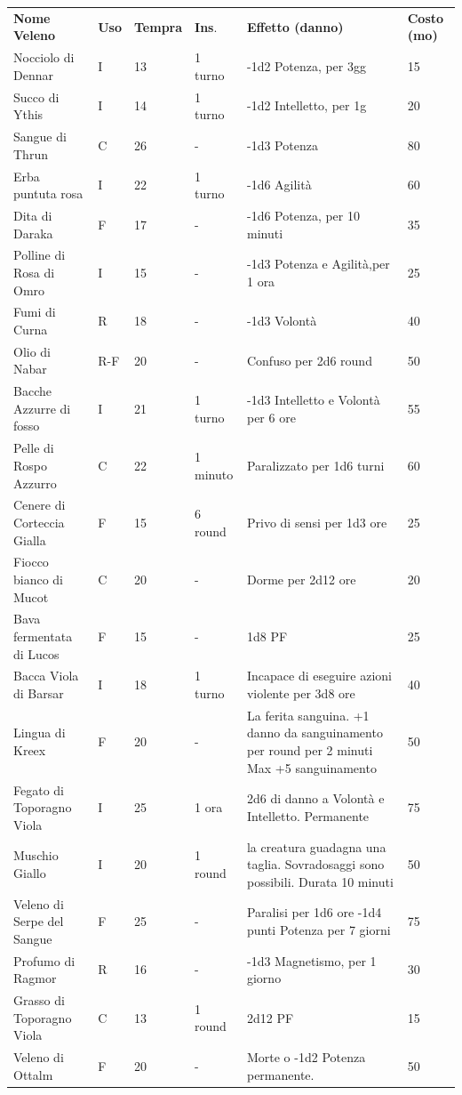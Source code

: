 \documentclass[a4paper,11pt,twoside,openany]{book}
\begin{document}
\begin{tabular}{L{3.7cm} k{1cm} k{1.5cm} k{1.3cm} k{5.5cm} k{1.5cm}}
	\toprule
	\textbf{Nome Veleno}  & \textbf{Uso} & \textbf{Tempra} & \textbf{Ins}. & \textbf{Effetto (danno)} & \textbf{Costo (mo)}\tabularnewline
	Nocciolo di Dennar   & I  & 13    & 1 turno  & -1d2 Potenza, per 3gg    & 15\tabularnewline
	Succo di Ythis & I  & 14    & 1 turno  & -1d2 Intelletto, per 1g  & 20\tabularnewline
	Sangue di Thrun    & C  & 26    & -   & -1d3 Potenza   & 80\tabularnewline
	Erba puntuta rosa     & I  & 22    & 1 turno  & -1d6 Agilità   & 60\tabularnewline
	Dita di Daraka & F  & 17    & -   & -1d6 Potenza, per 10 minuti   & 35\tabularnewline
	Polline di Rosa di Omro   & I  & 15    & -   & -1d3 Potenza e Agilità,per 1 ora   & 25\tabularnewline
	Fumi di Curna   & R  & 18    & -   & -1d3 Volontà   & 40\tabularnewline
	Olio di Nabar   & R-F& 20    & -   & Confuso per 2d6 round    & 50\tabularnewline
	Bacche Azzurre di fosso   & I  & 21    & 1 turno  & -1d3 Intelletto e Volontà per 6 ore& 55\tabularnewline
	Pelle di Rospo Azzurro     & C  & 22    & 1 minuto & Paralizzato per 1d6 turni& 60\tabularnewline
	Cenere di Corteccia Gialla  & F  & 15    & 6 round  & Privo di sensi per 1d3 ore    & 25\tabularnewline
	Fiocco bianco di Mucot     & C  & 20    & -   & Dorme per 2d12 ore  & 20\tabularnewline
	Bava fermentata di Lucos & F  & 15    & -   & 1d8 PF    & 25\tabularnewline
	Bacca Viola di Barsar  & I  & 18    & 1 turno  & Incapace di eseguire azioni violente per 3d8 ore  & 40   \\
	Lingua di Kreex    & F  & 20    & -   & La ferita sanguina. +1 danno da sanguinamento per round per 2 minuti Max +5 sanguinamento & 50   \\
	Fegato di Toporagno Viola    & I  & 25    & 1 ora    & 2d6 di danno a Volontà e Intelletto. Permanente   & 75   \\
	Muschio Giallo & I  & 20    & 1 round  & la creatura guadagna una taglia. Sovradosaggi sono possibili. Durata 10 minuti  & 50\tabularnewline
	Veleno di Serpe del Sangue  & F  & 25    & -   & Paralisi per 1d6 ore -1d4 punti Potenza per 7 giorni   & 75   \\
	Profumo di Ragmor     & R  & 16    & -   & -1d3 Magnetismo, per 1 giorno & 30\tabularnewline
	Grasso di Toporagno Viola    & C  & 13    & 1 round  & 2d12 PF   & 15\tabularnewline
	Veleno di Ottalm  & F  & 20    & -   & Morte o -1d2 Potenza permanente.   & 50\tabularnewline
\end{tabular}
\end{document}

